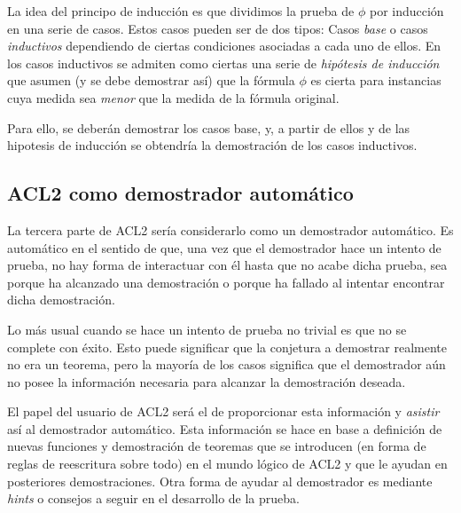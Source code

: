 \documentclass[a4paper,10pt]{article}
\begin{document}
\par\vspace{10pt}

La idea del principo de inducción es que dividimos la prueba de $\phi$ por inducción en una serie de casos. Estos casos pueden ser de dos tipos: Casos \emph{base} o casos \emph{inductivos} dependiendo de ciertas condiciones asociadas a cada uno de ellos. En los casos inductivos se admiten como ciertas una serie de \emph{hipótesis de inducción} que asumen (y se debe demostrar así) que la fórmula $\phi$ es cierta para instancias cuya medida sea \emph{menor} que la medida de la fórmula original.

\par\vspace{10pt}

Para ello, se deberán demostrar los casos base, y, a partir de ellos y de las hipotesis de inducción se obtendría la demostración de los casos inductivos.

\vspace{12pt}
\subsection{ACL2 como demostrador automático}
\vspace{10pt}

La tercera parte de ACL2 sería considerarlo como un demostrador automático. Es automático en el sentido de que, una vez que el demostrador hace un intento de prueba, no hay forma de interactuar con él hasta que no acabe dicha prueba, sea porque ha alcanzado una demostración o porque ha fallado al intentar encontrar dicha demostración.

\par\vspace{10pt}

Lo más usual cuando se hace un intento de prueba no trivial es que no se complete con éxito. Esto puede significar que la conjetura a demostrar realmente no era un teorema, pero la mayoría de los casos significa que el demostrador aún no posee la información necesaria para alcanzar la demostración deseada. 

\par\vspace{10pt}

El papel del usuario de ACL2 será el de proporcionar esta información y \emph{asistir} así al demostrador automático. Esta información se hace en base a definición de nuevas funciones y demostración de teoremas que se introducen (en forma de reglas de reescritura sobre todo) en el mundo lógico de ACL2 y que le ayudan en posteriores demostraciones. Otra forma de ayudar al demostrador es mediante \emph{hints} o consejos a seguir en el desarrollo de la prueba.
\end{document}
